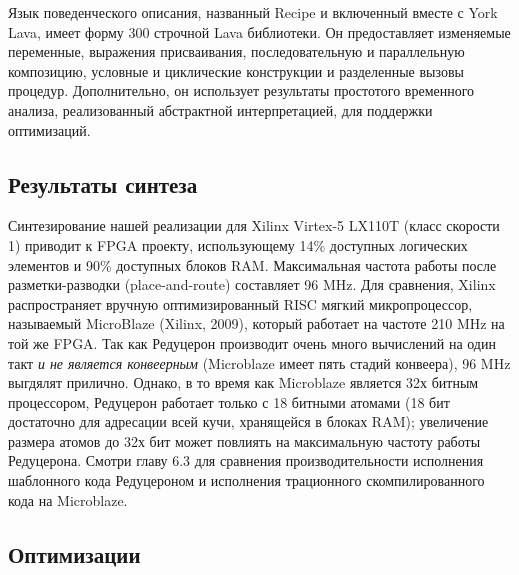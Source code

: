 \documentclass[flenqn, 14pt]{extarticle}
\begin{document}
Язык поведенческого описания, названный Recipe и включенный вместе с York Lava, имеет форму 300 строчной Lava библиотеки. Он предоставляет изменяемые переменные, выражения присваивания, последовательную и параллельную композицию, условные и циклические конструкции и разделенные вызовы процедур. Дополнительно, он использует результаты простотого временного анализа, реализованный абстрактной интерпретацией, для поддержки оптимизаций.

\subsection{Результаты синтеза}
Синтезирование нашей реализации для Xilinx Virtex-5 LX110T (класс скорости 1) приводит к FPGA проекту, использующему 14\% доступных логических элементов и 90\% доступных блоков RAM. Максимальная частота работы после разметки-разводки (place-and-route) составляет 96 MHz. Для сравнения, Xilinx распространяет вручную оптимизированный RISC мягкий микропроцессор, называемый MicroBlaze (Xilinx, 2009), который работает на частоте 210 MHz на той же FPGA. Так как Редуцерон производит очень много вычислений на один такт \textit{и не является конвеерным} (Microblaze имеет пять стадий конвеера), 96 MHz выгдялят прилично. Однако, в то время как Microblaze является 32х битным процессором, Редуцерон работает только с 18 битными атомами (18 бит достаточно для адресации всей кучи, хранящейся в блоках RAM); увеличение размера атомов до 32х бит может повлиять на максимальную частоту работы Редуцерона. Смотри главу 6.3 для сравнения производительности исполнения шаблонного кода Редуцероном и исполнения трационного скомпилированного кода на Microblaze.

\subsection{Оптимизации}
\end{document}
